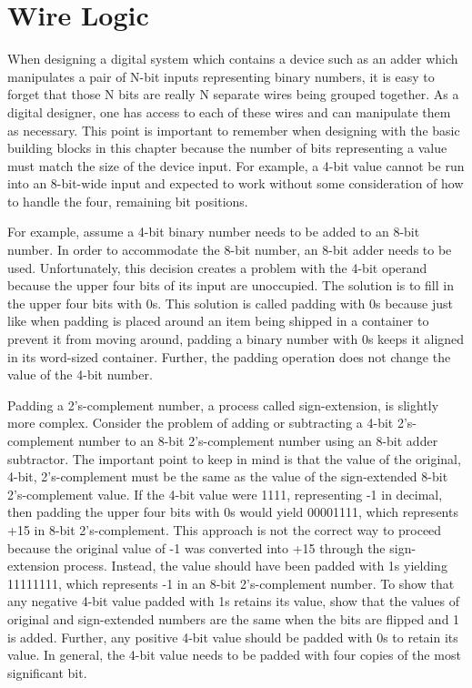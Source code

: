 \section{Wire Logic}
When  designing a digital system which contains a device
such as an adder which manipulates a pair of N-bit inputs representing
binary numbers, it is easy to forget that those N bits are really
N separate wires being grouped together.  As a
digital designer, one has access to each of these wires
and can manipulate them as necessary.  This point is important
to remember when designing with the basic building
blocks in this chapter because the number of bits representing a 
value must match the size of the device input.  For example, 
a 4-bit value cannot be run into an 8-bit-wide input and 
expected to work without some consideration of how to
handle the four, remaining bit positions.

For example, assume a 4-bit binary number 
needs to be added to an 8-bit number.  In order to 
accommodate the 8-bit number, an 8-bit
adder needs to be used.  Unfortunately, this decision creates a 
problem with the 
4-bit operand because the upper four bits of its input
are unoccupied.  The solution is to fill in the upper
four bits with 0s.  This solution is called padding with 0s 
because just like when padding is placed around an item
being shipped in a container to prevent it 
from moving around, padding a binary number with 0s 
keeps it aligned in its word-sized container. Further, the padding operation does not 
change the value of the 4-bit number.

Padding a 2's-complement number, a process called sign-extension,
is slightly more complex. Consider the problem of adding or 
subtracting a 4-bit 2's-complement number to an 8-bit 2's-complement 
number using an 8-bit adder subtractor.  The important 
point to keep in mind is that the value of the original, 4-bit, 
2's-complement must be the same as the value of the sign-extended 
8-bit 2's-complement value.  If the 4-bit value were 1111, 
representing -1 in decimal, then padding the upper four
bits with 0s would yield 00001111, which represents +15
in 8-bit 2's-complement.  This approach is not the correct way to proceed
because the original value of -1 was converted into +15 
through the sign-extension process.  Instead, the value should have been padded 
with 1s yielding 11111111, which represents -1 in an
8-bit 2's-complement number.  To show
that any negative 4-bit value padded with 1s retains its value,
show that the values of original and sign-extended 
numbers are the same when the bits are flipped and 1 is added.
Further,  any positive 4-bit value should
be padded with 0s to retain its value.  In general, the 4-bit
value needs to be padded with four copies of the most significant 
bit.

